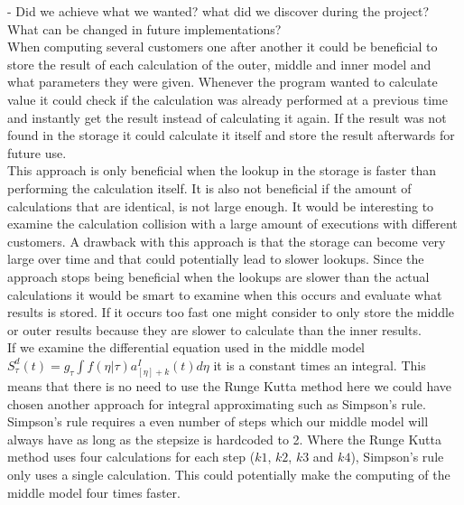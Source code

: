 
- Did we achieve what we wanted? what did we discover during the project? What can be changed in future implementations? \\

When computing several customers one after another it could be beneficial to store the result of each calculation of the outer, middle and inner model and what parameters they were given. Whenever the program wanted to calculate value it could check if the calculation was already performed at a previous time and instantly get the result instead of calculating it again. If the result was not found in the storage it could calculate it itself and store the result afterwards for future use. \\ 

This approach is only beneficial when the lookup in the storage is faster than performing the calculation itself. It is also not beneficial if the amount of calculations that are identical, is not large enough. It would be interesting to examine the calculation collision with a large amount of executions with different customers. A drawback with this approach is that the storage can become very large over time and that could potentially lead to slower lookups. Since the approach stops being beneficial when the lookups are slower than the actual calculations it would be smart to examine when this occurs and evaluate what results is stored. If it occurs too fast one might consider to only store the middle or outer results because they are slower to calculate than the inner results. \\

If we examine the differential equation used in the middle model \\$S_\tau^d(t) = g_\tau \int f(\eta|\tau)a_{[\eta] + k}^I(t)d\eta$ it is a constant times an integral. This means that there is no need to use the Runge Kutta method here we could have chosen another approach for integral approximating such as Simpson's rule\cite{simp}. Simpson's rule requires a even number of steps which our middle model will always have as long as the stepsize is hardcoded to 2. Where the Runge Kutta method uses four calculations for each step ($k1$, $k2$, $k3$ and $k4$), Simpson's rule only uses a single calculation. This could potentially make the computing of the middle model four times faster. 
